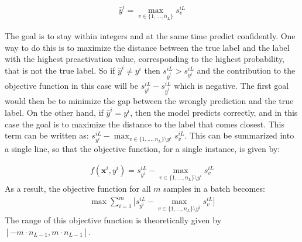 \begin{align}
    \label{y_hat} \hat{y}^i = \max _{v\in \{1, \ldots, n_L \} } s_v^{iL}
\end{align}

\noindent The goal is to stay within integers and at the same time predict confidently. One way to do this is to maximize the distance between the true label and the label with the highest preactivation value, corresponding to the highest probability, that is not the true label. So if $\hat{y}^i \neq y^i$ then $s_{\hat{y}^i}^{iL} > s_{y^i}^{iL}$ and the contribution to the objective function in this case will be $s^{iL}_{y^i} - s_{\hat{y}^i}^{iL}$ which is negative. The first goal would then be to minimize the gap between the wrongly prediction and the true label. On the other hand, if $\hat{y}^i = y^i$, then the model predicts correctly, and in this case the goal is to maximize the distance to the label that comes closest. This term can be written as: $s_{y^i}^{iL} - \max_{v \in \{1, \ldots, n_L\} \setminus y^i } s_v ^{iL}$. This can be summarized into a single line, so that the objective function, for a single instance, is given by: 

\begin{align}
    \label{integer_objective} f(\mathbf{x}^i, y^i) = s_{y ^i} ^{iL} - \max_{v \in \{1, \ldots, n_L\} \setminus y^i } s_v ^{iL}
\end{align}
As a result, the objective function for all $m$ samples in a batch becomes:
\begin{align}
    \label{int} \max \sum_{i=1} ^m \big[ s_{y ^i} ^{iL} - \max_{v \in \{1, \ldots, n_L\} \setminus y^i } s_v ^{iL}  \big]
\end{align}
The range of this objective function is theoretically given by $[-m \cdot n_{L-1}, m \cdot n_{L-1}]$. \\

